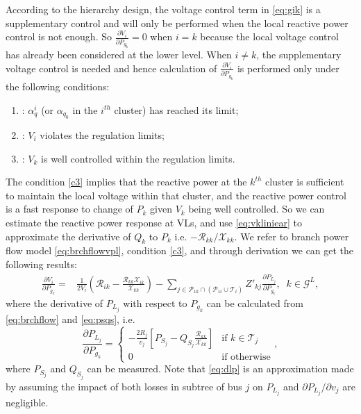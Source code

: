 \documentclass{article}
\begin{document}
According to the hierarchy design, the voltage control term in \eqref{eq:gik} is a supplementary control and will only be performed when the local reactive power control is not enough. So $\frac{\partial V_i}{\partial P_{g_k}}=0$ when $i=k$ because the local voltage control has already been considered at the lower level. When $i\neq k$, the supplementary voltage control is needed and hence calculation of $\frac{\partial V_i}{\partial P_{g_k}}$ is performed only under the following conditions: 
\begin{enumerate}[label=C\arabic*]
    \item: $\alpha^i_{q}$ (or $\alpha_{q_0}$ in the $i^{th}$ cluster) has reached its limit;
    \item: $V_i$ violates the regulation limits;\label{c2}
    \item: $V_k$ is well controlled within the regulation limits.\label{c3}
\end{enumerate}

The condition \ref{c3} implies that the reactive power at the $k^{th}$ cluster is sufficient to maintain the local voltage within that cluster, and the reactive power control is a fast response to change of $P_k$ given $V_k$ being well controlled. So we can estimate the reactive power response at VLs, and use \eqref{eq:vkliniear} to approximate the derivative of $Q_k$ to $P_k$ i.e. $-{\mathcal{R}_{kk}}/{\mathcal{X}_{kk}}$. We refer to branch power flow model \eqref{eq:brchflowvpl}, condition \ref{c3}, and through derivation we can get the following results:
\begin{equation}
\begin{split}
    \frac{\partial V_i}{\partial P_{g_k}} =& \frac{1}{2V_i}(\mathcal{R}_{ik}-\frac{\mathcal{R}_{kk}\mathcal{X}_{ik}}{\mathcal{X}_{kk}})-\sum_{j\in\mathcal {P}_{1k}\cap (\mathcal {P}_{1i}\cup \mathcal{T}_i)} Z'_{kj}\frac{\partial P_{L_j}}{\partial P_{g_k}},\;\;k \in \mathcal{G}^L,
\end{split}\label{eq:dvpl}
\end{equation}
where the derivative of $P_{L_j}$ with respect to $P_{g_k}$ can be calculated from \eqref{eq:brchflow} and \eqref{eq:psqs}, i.e.
\begin{equation}
    \frac{\partial P_{L_j}}{\partial P_{g_k}} =
    \begin{cases}
        -\frac{2R_j}{v_j}\left[P_{S_j}-Q_{S_j}\frac{\mathcal{R}_{kk}}{\mathcal{X}_{kk}}\right]& \text{if }k\in \mathcal{T}_j\\
        0 & \text{if otherwise}         
    \end{cases},\label{eq:dlp}
\end{equation}
where $P_{S_j}$ and $Q_{S_j}$ can be measured. Note that \eqref{eq:dlp} is an approximation made by assuming the impact of both losses in subtree of bus $j$ on $P_{L_j}$ and $\partial P_{L_j}/\partial v_j$ are negligible.
\end{document}
